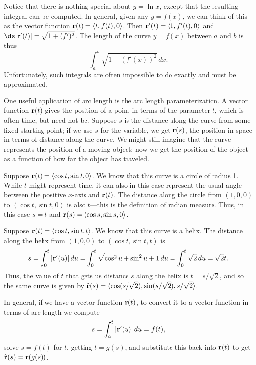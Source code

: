 Notice that there is nothing special about $y=\ln x$, except that the
resulting integral can be computed. In general, given any $y=f(x)$, we
can think of this as the vector function
${\bf r}(t)=\langle t,f(t),0\rangle$. Then 
${\bf r}'(t)=\langle 1,f'(t),0\rangle$ and
$\ds |{\bf r}'(t)|=\sqrt{1+(f')^2}$. The length of the curve $y=f(x)$
between $a$ and $b$ is thus
$$\int_a^b \sqrt{1+(f'(x))^2}\,dx.$$
Unfortunately, such integrals are often impossible to do exactly and
must be approximated.

One useful application of arc length is the {\dfont arc length
  parameterization}. A vector
function ${\bf r}(t)$ gives the position of a point in terms of the
parameter $t$, which is often time, but need not be. Suppose $s$ is
the distance along the curve from some fixed starting point; if we use
$s$ for the variable, we get ${\bf r}(s)$, the position in space in
terms of distance along the curve. We might still imagine that the
curve represents the position of a moving object; now we get the
position of the object as a function of how far the object has
traveled.

\begin{example} Suppose ${\bf r}(t)=\langle \cos t,\sin t,0\rangle$. We know
that this curve is a circle of radius 1. While $t$ might represent
time, it can also in this case represent the usual angle between the
positive $x$-axis and ${\bf r}(t)$. The distance along the circle from
$(1,0,0)$ to $(\cos t,\sin t,0)$ is also $t$---this is the
definition of radian measure. Thus, in this case $s=t$ and
${\bf r}(s)=\langle \cos s,\sin s,0\rangle$.
\end{example}

\begin{example} Suppose ${\bf r}(t)=\langle \cos t,\sin t,t\rangle$. We know
that this curve is a helix. The distance along the helix from $(1,0,0)$
to $(\cos t,\sin t,t)$ is 
$$s=\int_0^t |{\bf r}'(u)|\,du=\int_0^t \sqrt{\cos^2u+\sin^2u+1}\,du=
\int_0^t \sqrt{2}\,du=\sqrt2t.$$
Thus, the value of $t$ that gets us distance $s$ along the helix is
$t=s/\sqrt2$, and so the same curve is given by $\hat{\bf r}(s)=
\langle \cos(s/\sqrt2),\sin(s/\sqrt2),s/\sqrt2\rangle$.
\end{example}

In general, if we have a vector function ${\bf r}(t)$, to convert it
to a vector function in terms of arc length we compute
$$s=\int_a^t |{\bf r}'(u)|\,du=f(t),$$
solve $s=f(t)$ for $t$, getting $t=g(s)$, and substitute this back
into ${\bf r}(t)$ to get $\hat{\bf r}(s)={\bf r}(g(s))$.

